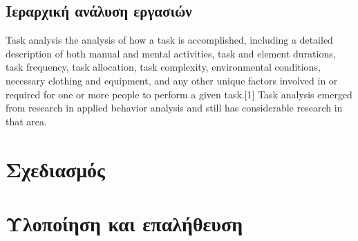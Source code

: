 \documentclass{assignment}
\begin{document}
\subsection{Ιεραρχική ανάλυση εργασιών}

Task analysis the analysis of how a task is accomplished, including a detailed description of both manual and mental activities, task and element durations, task frequency, task allocation, task complexity, environmental conditions, necessary clothing and equipment, and any other unique factors involved in or required for one or more people to perform a given task.[1] Task analysis emerged from research in applied behavior analysis and still has considerable research in that area. \cite{wiki:task_analysis}

\section{Σχεδιασμός}

\section{Υλοποίηση και επαλήθευση}

\newpage

 \label{Βιβλιογραφία}


\end{document}
